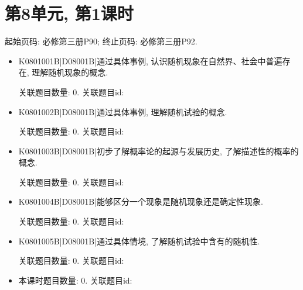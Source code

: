 \section*{第8单元, 第1课时}
起始页码: 必修第三册P90; 终止页码: 必修第三册P92.
\begin{itemize}
\item K0801001B|D08001B|通过具体事例, 认识随机现象在自然界、社会中普遍存在, 理解随机现象的概念.

关联题目数量: 0. 关联题目id: 

\item K0801002B|D08001B|通过具体事例, 理解随机试验的概念.

关联题目数量: 0. 关联题目id: 

\item K0801003B|D08001B|初步了解概率论的起源与发展历史, 了解描述性的概率的概念.

关联题目数量: 0. 关联题目id: 

\item K0801004B|D08001B|能够区分一个现象是随机现象还是确定性现象.

关联题目数量: 0. 关联题目id: 

\item K0801005B|D08001B|通过具体情境, 了解随机试验中含有的随机性.

关联题目数量: 0. 关联题目id: 

\item 本课时题目数量: 0. 关联题目id: 

\end{itemize}

